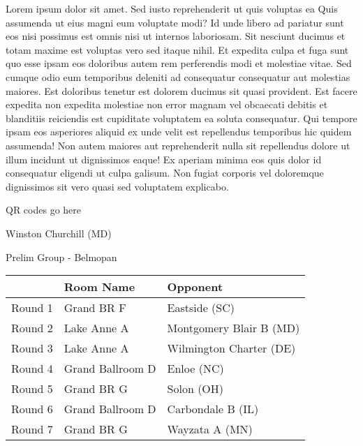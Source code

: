 \documentclass{article}%
\begin{document}
\vspace*{8pt}%
\linebreak%
\newline%
\newline%
Lorem ipsum dolor sit amet. Sed iusto reprehenderit ut quis voluptas ea Quis assumenda ut eius magni eum voluptate modi? Id unde libero ad pariatur sunt eos nisi possimus est omnis nisi ut internos laboriosam. Sit nesciunt ducimus et totam maxime est voluptas vero sed itaque nihil. Et expedita culpa et fuga sunt quo esse ipsam eos doloribus autem rem perferendis modi et molestiae vitae.\newline%
\newline%
Sed cumque odio eum temporibus deleniti ad consequatur consequatur aut molestias maiores. Est doloribus tenetur est dolorem ducimus sit quasi provident. Est facere expedita non expedita molestiae non error magnam vel obcaecati debitis et blanditiis reiciendis est cupiditate voluptatem ea soluta consequatur. Qui tempore ipsam eos asperiores aliquid ex unde velit est repellendus temporibus hic quidem assumenda!\newline%
\newline%
Non autem maiores aut reprehenderit nulla sit repellendus dolore ut illum incidunt ut dignissimos eaque! Ex aperiam minima eos quis dolor id consequatur eligendi ut culpa galisum. Non fugiat corporis vel doloremque dignissimos sit vero quasi sed voluptatem explicabo.\newline%
\newline%
%
\vspace*{30pt}%
\begin{center}%
\begin{Huge}%
QR codes go here%
\end{Huge}%
\end{center}%
\newpage%
%
\begin{center}%
\begin{Huge}%
Winston Churchill (MD)%
\end{Huge}%
\vspace*{8pt}%
\linebreak%
\begin{Large}%
Prelim Group {-} Belmopan%
\end{Large}%
\end{center}%
\begin{tabularx}{\textwidth}{|c|Y|Y|}%
\hline%
&Room Name&Opponent\\%
\hline%
Round 1&Grand BR F&Eastside (SC)\\%
Round 2&Lake Anne A&Montgomery Blair B (MD)\\%
Round 3&Lake Anne A&Wilmington Charter (DE)\\%
Round 4&Grand Ballroom D&Enloe (NC)\\%
Round 5&Grand BR G&Solon (OH)\\%
Round 6&Grand Ballroom D&Carbondale B (IL)\\%
Round 7&Grand BR G&Wayzata A (MN)\\%
\hline%
\end{tabularx}%
\end{document}
